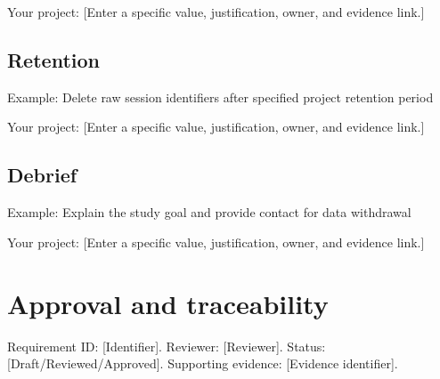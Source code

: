 \documentclass[11pt]{article}
\begin{document}
Your project: [Enter a specific value, justification, owner, and evidence link.]


\subsection{Retention}
Example: Delete raw session identifiers after specified project retention period

Your project: [Enter a specific value, justification, owner, and evidence link.]


\subsection{Debrief}
Example: Explain the study goal and provide contact for data withdrawal

Your project: [Enter a specific value, justification, owner, and evidence link.]


\section{Approval and traceability}
Requirement ID: [Identifier]. Reviewer: [Reviewer]. Status: [Draft/Reviewed/Approved]. Supporting evidence: [Evidence identifier].
\end{document}
